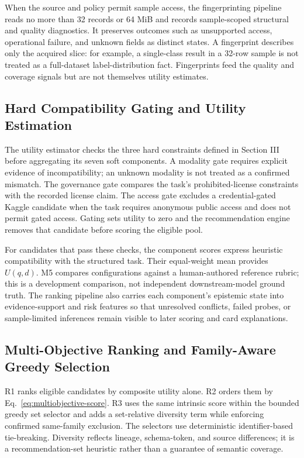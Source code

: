 \documentclass[conference]{IEEEtran}
\begin{document}
When the source and policy permit sample access, the fingerprinting pipeline reads no more than 32 records or 64 MiB and records sample-scoped structural and quality diagnostics. It preserves outcomes such as unsupported access, operational failure, and unknown fields as distinct states. A fingerprint describes only the acquired slice: for example, a single-class result in a 32-row sample is not treated as a full-dataset label-distribution fact. Fingerprints feed the quality and coverage signals but are not themselves utility estimates.

\subsection{Hard Compatibility Gating and Utility Estimation}
The utility estimator checks the three hard constraints defined in Section III before aggregating its seven soft components. A modality gate requires explicit evidence of incompatibility; an unknown modality is not treated as a confirmed mismatch. The governance gate compares the task's prohibited-license constraints with the recorded license claim. The access gate excludes a credential-gated Kaggle candidate when the task requires anonymous public access and does not permit gated access. Gating sets utility to zero and the recommendation engine removes that candidate before scoring the eligible pool.

For candidates that pass these checks, the component scores express heuristic compatibility with the structured task. Their equal-weight mean provides $U(q,d)$. M5 compares configurations against a human-authored reference rubric; this is a development comparison, not independent downstream-model ground truth. The ranking pipeline also carries each component's epistemic state into evidence-support and risk features so that unresolved conflicts, failed probes, or sample-limited inferences remain visible to later scoring and card explanations.

\subsection{Multi-Objective Ranking and Family-Aware Greedy Selection}
R1 ranks eligible candidates by composite utility alone. R2 orders them by Eq.~\ref{eq:multiobjective-score}. R3 uses the same intrinsic score within the bounded greedy set selector and adds a set-relative diversity term while enforcing confirmed same-family exclusion. The selectors use deterministic identifier-based tie-breaking. Diversity reflects lineage, schema-token, and source differences; it is a recommendation-set heuristic rather than a guarantee of semantic coverage.
\end{document}
